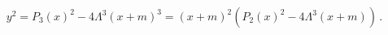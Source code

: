 \begin{equation}
y^2=P_3(x)^2-4\Lambda^3 (x+m)^3=(x+m)^2(P_2(x)^2-4\Lambda^3 (x+m)) \, .
\end{equation}


